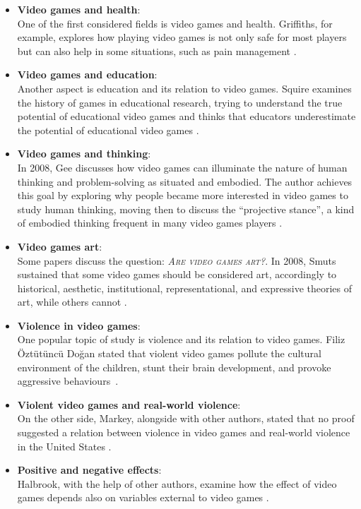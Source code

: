 	\begin{itemize}
	
		\item \textbf{Video games and health}:\\				
			One of the first considered fields is video games and health. 
			Griffiths, for example, explores how playing video games is not only safe for most players but can also help in some situations, such as pain management \cite{2005331}.
	
		\item \textbf{Video games and education}:\\
			Another aspect is education and its relation to video games. 
			Squire examines the history of games in educational research, trying to understand the true potential of educational video games and thinks that educators underestimate the potential of educational video games \cite{14n205}. 
				
		\item \textbf{Video games and thinking}:\\
			In 2008, Gee discusses how video games can illuminate the nature of human thinking and problem-solving as situated and embodied. 
			The author achieves this goal by exploring why people became more interested in video games to study human thinking, moving then to discuss the ``projective stance'', 
			a kind of embodied thinking frequent in many video games players \cite{10.1177/1555412008317309}.

		\item \textbf{Video games art}:\\
			Some papers discuss the question: \textsc{\textit{Are video games art?}}. 
			In 2008, Smuts sustained that some video games should be considered art, accordingly to historical, aesthetic, institutional, representational, and expressive theories of art, while others cannot \cite{1555412008317309}.
	
		\item \textbf{Violence in video games}:\\
			One popular topic of study is violence and its relation to video games. 
			Filiz Öztütüncü Doğan stated that violent video games pollute the cultural environment of the children, stunt their brain development, and provoke aggressive behaviours~\cite{10.1177/155541200831730}.
			
		\item \textbf{Violent video games and real-world violence}:\\
			On the other side, Markey, alongside with other authors, stated that no proof suggested a relation between violence in video games and real-world violence in the United States \cite{10.1037/ppm0000030}.
				
		\item \textbf{Positive and negative effects}:\\
			Halbrook, with the help of other authors, examine how the effect of video games depends also on variables external to video games \cite{10.1177/1745691619863807}. 
			
	\end{itemize}

